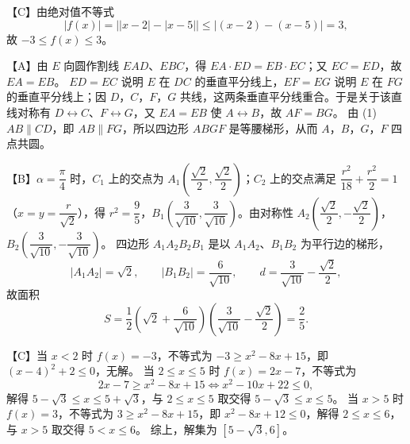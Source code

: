 \begin{answer}
【C】由绝对值不等式
\nopagebreak[4]
\[|f(x)|=\bigl||x-2|-|x-5|\bigr|\leqslant|(x-2)-(x-5)|=3,\]
故 $-3\leqslant f(x)\leqslant3$。

【A】由 $E$ 向圆作割线 $EAD$、$EBC$，得 $EA\cdot ED=EB\cdot EC$；又 $EC=ED$，故 $EA=EB$。
$ED=EC$ 说明 $E$ 在 $DC$ 的垂直平分线上，$EF=EG$ 说明 $E$ 在 $FG$ 的垂直平分线上；因 $D$，$C$，$F$，$G$ 共线，这两条垂直平分线重合。于是关于该直线对称有 $D\leftrightarrow C$、$F\leftrightarrow G$，又 $EA=EB$ 使 $A\leftrightarrow B$，故 $AF=BG$。
由 (1) $AB\parallel CD$，即 $AB\parallel FG$，所以四边形 $ABGF$ 是等腰梯形，从而 $A$，$B$，$G$，$F$ 四点共圆。

【B】$\alpha=\dfrac\pi4$ 时，$C_1$ 上的交点为 $A_1\left(\dfrac{\sqrt2}2,\dfrac{\sqrt2}2\right)$；$C_2$ 上的交点满足 $\dfrac{r^2}{18}+\dfrac{r^2}2=1$（$x=y=\dfrac r{\sqrt2}$），得 $r^2=\dfrac95$，$B_1\left(\dfrac3{\sqrt{10}},\dfrac3{\sqrt{10}}\right)$。由对称性 $A_2\left(\dfrac{\sqrt2}2,-\dfrac{\sqrt2}2\right)$，$B_2\left(\dfrac3{\sqrt{10}},-\dfrac3{\sqrt{10}}\right)$。
四边形 $A_1A_2B_2B_1$ 是以 $A_1A_2$、$B_1B_2$ 为平行边的梯形，
\nopagebreak[4]
\[|A_1A_2|=\sqrt2,\qquad |B_1B_2|=\frac6{\sqrt{10}},\qquad d=\frac3{\sqrt{10}}-\frac{\sqrt2}2,\]
故面积
\nopagebreak[4]
\[S=\frac12\left(\sqrt2+\frac6{\sqrt{10}}\right)\left(\frac3{\sqrt{10}}-\frac{\sqrt2}2\right)=\frac25.\]

【C】当 $x<2$ 时 $f(x)=-3$，不等式为 $-3\geqslant x^2-8x+15$，即 $(x-4)^2+2\leqslant0$，无解。
当 $2\leqslant x\leqslant5$ 时 $f(x)=2x-7$，不等式为
\nopagebreak[4]
\[2x-7\geqslant x^2-8x+15\Longleftrightarrow x^2-10x+22\leqslant0,\]
解得 $5-\sqrt3\leqslant x\leqslant5+\sqrt3$，与 $2\leqslant x\leqslant5$ 取交得 $5-\sqrt3\leqslant x\leqslant5$。
当 $x>5$ 时 $f(x)=3$，不等式为 $3\geqslant x^2-8x+15$，即 $x^2-8x+12\leqslant0$，解得 $2\leqslant x\leqslant6$，与 $x>5$ 取交得 $5<x\leqslant6$。
综上，解集为 $[5-\sqrt3,6]$。



\end{answer}